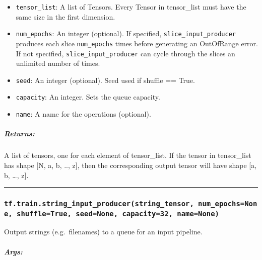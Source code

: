 \begin{itemize}
\tightlist
\item
  \texttt{tensor\_list}: A list of Tensors. Every Tensor in tensor\_list
  must have the same size in the first dimension.
\item
  \texttt{num\_epochs}: An integer (optional). If specified,
  \texttt{slice\_input\_producer} produces each slice
  \texttt{num\_epochs} times before generating an OutOfRange error. If
  not specified, \texttt{slice\_input\_producer} can cycle through the
  slices an unlimited number of times.
\item
  \texttt{seed}: An integer (optional). Seed used if shuffle == True.
\item
  \texttt{capacity}: An integer. Sets the queue capacity.
\item
  \texttt{name}: A name for the operations (optional).
\end{itemize}

\subparagraph{Returns: }\label{returns-52}

A list of tensors, one for each element of tensor\_list. If the tensor
in tensor\_list has shape {[}N, a, b, .., z{]}, then the corresponding
output tensor will have shape {[}a, b, \ldots{}, z{]}.

\begin{center}\rule{0.5\linewidth}{\linethickness}\end{center}

\subsubsection{\texorpdfstring{\texttt{tf.train.string\_input\_producer(string\_tensor,\ num\_epochs=None,\ shuffle=True,\ seed=None,\ capacity=32,\ name=None)}
}{tf.train.string\_input\_producer(string\_tensor, num\_epochs=None, shuffle=True, seed=None, capacity=32, name=None) }}\label{tf.train.stringux5finputux5fproducerstringux5ftensor-numux5fepochsnone-shuffletrue-seednone-capacity32-namenone}

Output strings (e.g.~filenames) to a queue for an input pipeline.

\subparagraph{Args: }\label{args-62}

